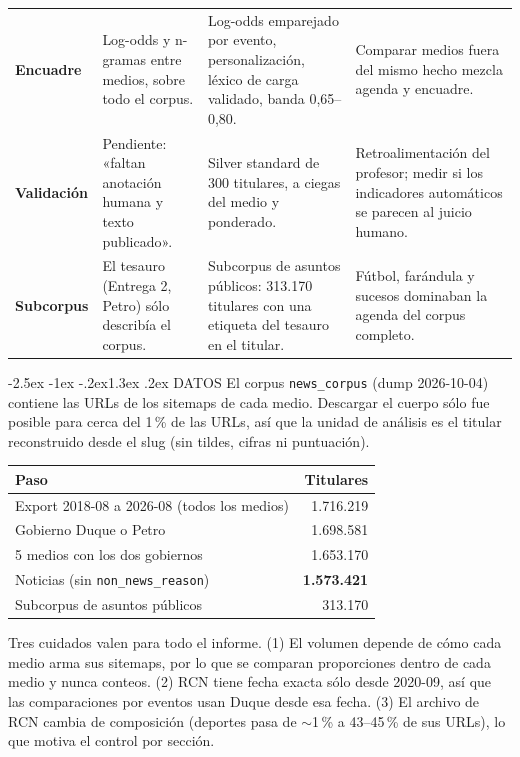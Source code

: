 \documentclass[10pt,twocolumn]{article}
\makeatletter
\renewcommand{\section}{\@startsection{section}{1}{\z@}%
  {-2.5ex \@plus -1ex \@minus -.2ex}{1.3ex \@plus .2ex}%
  {\normalfont\large\bfseries\centering}}
\makeatother
\begin{document}
\begin{table}[t]
\begin{tabularx}{\textwidth}{>{\bfseries}p{2.0cm} Y Y Y}
Encuadre & Log-odds y n-gramas entre medios, sobre todo el corpus. & Log-odds emparejado por evento, personalización, léxico de carga validado, banda 0,65--0,80. & Comparar medios fuera del mismo hecho mezcla agenda y encuadre.\\
Validación & Pendiente: «faltan anotación humana y texto publicado». & Silver standard de 300 titulares, a ciegas del medio y ponderado. & Retroalimentación del profesor; medir si los indicadores automáticos se parecen al juicio humano.\\
Subcorpus & El tesauro (Entrega 2, Petro) sólo describía el corpus. & Subcorpus de asuntos públicos: 313.170 titulares con una etiqueta del tesauro en el titular. & Fútbol, farándula y sucesos dominaban la agenda del corpus completo.\\
\bottomrule
\end{tabularx}
\end{table}

\section{DATOS}
El corpus \texttt{news\_corpus} (dump 2026-10-04) contiene las URLs de los
sitemaps de cada medio. Descargar el cuerpo sólo fue posible para cerca del
1\,\% de las URLs, así que la unidad de análisis es el titular reconstruido
desde el slug (sin tildes, cifras ni puntuación).

\begin{center}\small\begin{tabular}{lr}\toprule
Paso & Titulares\\\midrule
Export 2018-08 a 2026-08 (todos los medios) & 1.716.219\\
Gobierno Duque o Petro & 1.698.581\\
5 medios con los dos gobiernos & 1.653.170\\
Noticias (sin \texttt{non\_news\_reason}) & \textbf{1.573.421}\\
Subcorpus de asuntos públicos & 313.170\\
\bottomrule\end{tabular}\end{center}

Tres cuidados valen para todo el informe. (1) El volumen depende de cómo cada
medio arma sus sitemaps, por lo que se comparan proporciones dentro de cada
medio y nunca conteos. (2) RCN tiene fecha exacta sólo desde 2020-09, así que
las comparaciones por eventos usan Duque desde esa fecha. (3) El archivo de RCN
cambia de composición (deportes pasa de $\sim$1\,\% a 43--45\,\% de sus URLs), lo
que motiva el control por sección.
\end{document}

